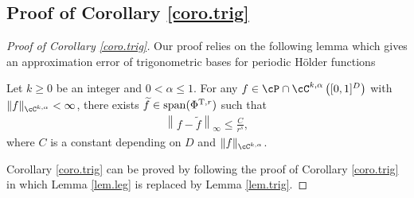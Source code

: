 \documentclass[11pt]{article} %
\newcommand{\spspan}{\mathrm{span}}
\begin{document}
\subsection{Proof of Corollary \ref{coro.trig}}
\label{coro.trig.proof}
\begin{proof}[Proof of Corollary \ref{coro.trig}]
	Our proof relies on the following lemma which gives an approximation error of trigonometric bases for periodic H\"{o}lder functions 
	\begin{lemma}\label{lem.trig}
		Let $k\geq 0$ be an integer and $0<\alpha\leq 1$. For any $f\in \cP\cap \cC^{k,\alpha}\left([0,1]^D\right)$ with $\|f\|_{\cC^{k,\alpha}}<\infty$, there exists $\widetilde{f}\in \spspan(\Phi^{{\rm T},r})$ such that
		\begin{align}
			\left\|f-\widetilde{f}\right\|_{\infty}\leq \frac{C}{r^s},
		\end{align}
		where $C$ is a constant depending on $D$ and $\|f\|_{\cC^{k,\alpha}}$.
	\end{lemma}
	Corollary \ref{coro.trig} can be proved by following the proof of Corollary \ref{coro.trig} in which Lemma \ref{lem.leg} is replaced by Lemma \ref{lem.trig}.
\end{proof}
\end{document}
